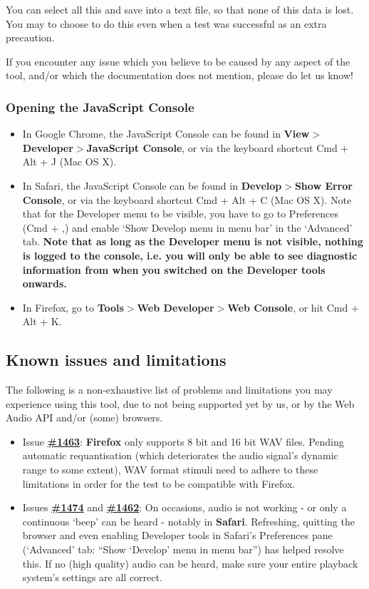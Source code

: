 \documentclass[11pt, oneside]{article}   	%
\begin{document}
		You can select all this and save into a text file, so that none of this data is lost. You may to choose to do this even when a test was successful as an extra precaution. 

		If you encounter any issue which you believe to be caused by any aspect of the tool, and/or which the documentation does not mention, please do let us know! 

		\subsubsection*{Opening the JavaScript Console}
	        \begin{itemize}
	            \item In Google Chrome, the JavaScript Console can be found in \textbf{View$>$Developer$>$JavaScript Console}, or via the keyboard shortcut Cmd + Alt + J (Mac OS X). 
	            \item In Safari, the JavaScript Console can be found in \textbf{Develop$>$Show Error Console}, or via the keyboard shortcut Cmd + Alt + C (Mac OS X). Note that for the Developer menu to be visible, you have to go to Preferences (Cmd + ,) and enable `Show Develop menu in menu bar' in the `Advanced' tab. \textbf{Note that as long as the Developer menu is not visible, nothing is logged to the console, i.e. you will only be able to see diagnostic information from when you switched on the Developer tools onwards.}
	            \item In Firefox, go to \textbf{Tools$>$Web Developer$>$Web Console}, or hit Cmd + Alt + K. 
	        \end{itemize}

	\subsection{Known issues and limitations}
	\label{sec:knownissues}

		The following is a non-exhaustive list of problems and limitations you may experience using this tool, due to not being supported yet by us, or by the Web Audio API and/or (some) browsers. 

		\begin{itemize}
			\item Issue \href{https://code.soundsoftware.ac.uk/issues/1463}{\textbf{\#1463}}: \textbf{Firefox} only supports 8 bit and 16 bit WAV files. Pending automatic requantisation (which deteriorates the audio signal's dynamic range to some extent), WAV format stimuli need to adhere to these limitations in order for the test to be compatible with Firefox. 
			\item Issues \href{https://code.soundsoftware.ac.uk/issues/1474}{\textbf{\#1474}} and \href{https://code.soundsoftware.ac.uk/issues/1462}{\textbf{\#1462}}: On occasions, audio is not working - or only a continuous `beep' can be heard - notably in \textbf{Safari}. Refreshing, quitting the browser and even enabling Developer tools in Safari's Preferences pane (`Advanced' tab: ``Show `Develop' menu in menu bar'') has helped resolve this. If no (high quality) audio can be heard, make sure your entire playback system's settings are all correct. 
		\end{itemize}
\end{document}
